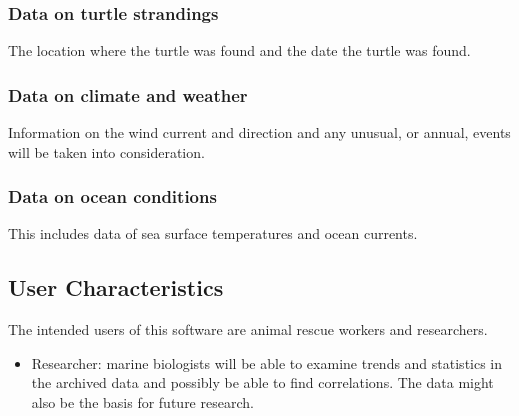 \documentclass[onecolumn, draftclsnofoot,10pt, compsoc]{IEEEtran}
\begin{document}
\begin{singlespace}
    \subsubsection{Data on turtle strandings}
    The location where the turtle was found and the date the turtle was found.
    \subsubsection{Data on climate and weather}
    Information on the wind current and direction and any unusual, or annual, events will be taken into consideration.
    \subsubsection{Data on ocean conditions}
    This includes data of sea surface temperatures and ocean currents.
\subsection{User Characteristics}
    The intended users of this software are animal rescue workers and researchers.  
    \begin{itemize}
        \item Researcher: marine biologists will be able to examine trends and statistics in the archived data and possibly be able to find correlations.  The data might also be the basis for future research. 
    \end{itemize} 

\end{singlespace}
\end{document}
